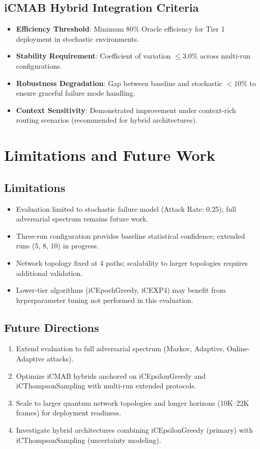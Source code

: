 \documentclass[12pt,a4paper]{article}
\begin{document}
\subsection{iCMAB Hybrid Integration Criteria}
\begin{itemize}
\item \textbf{Efficiency Threshold}: Minimum 80\% Oracle efficiency for Tier 1 deployment in stochastic environments.
\item \textbf{Stability Requirement}: Coefficient of variation \(\leq 3.0\%\) across multi-run configurations.
\item \textbf{Robustness Degradation}: Gap between baseline and stochastic \(<10\%\) to ensure graceful failure mode handling.
\item \textbf{Context Sensitivity}: Demonstrated improvement under context-rich routing scenarios (recommended for hybrid architectures).
\end{itemize}

\section{Limitations and Future Work}

\subsection{Limitations}
\begin{itemize}
\item Evaluation limited to stochastic failure model (Attack Rate: 0.25); full adversarial spectrum remains future work.
\item Three-run configuration provides baseline statistical confidence; extended runs (5, 8, 10) in progress.
\item Network topology fixed at 4 paths; scalability to larger topologies requires additional validation.
\item Lower-tier algorithms (iCEpochGreedy, iCEXP4) may benefit from hyperparameter tuning not performed in this evaluation.
\end{itemize}

\subsection{Future Directions}
\begin{enumerate}
\item Extend evaluation to full adversarial spectrum (Markov, Adaptive, Online-Adaptive attacks).
\item Optimize iCMAB hybrids anchored on iCEpsilonGreedy and iCThompsonSampling with multi-run extended protocols.
\item Scale to larger quantum network topologies and longer horizons (10K--22K frames) for deployment readiness.
\item Investigate hybrid architectures combining iCEpsilonGreedy (primary) with iCThompsonSampling (uncertainty modeling).
\end{enumerate}
\end{document}
